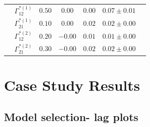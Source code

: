 \documentclass[12pt]{TD-CJS}
\begin{document}
\begin{table}[t]
{\begin{tabular}{ccccccc}
                             & $\Gamma^{*(1)}_{12}$          & $0.50$                         & $0.00$                   & $0.00$                           & $0.07 \pm 0.01$                             \\
                             & $\Gamma^{*(1)}_{21}$          & $0.10$                         & $0.00$                   & $0.02$                           & $0.02 \pm 0.00$                             \\
                             & $\Gamma^{*(2)}_{12}$          & $0.20$                         & $-0.00$                   & $0.01$                           & $0.01 \pm 0.00$                             \\
                             & $\Gamma^{*(2)}_{21}$          & $0.30$                         & $-0.00$                   & $0.02$                           & $0.02 \pm 0.00$                             \\ \hline

\end{tabular}
}
\label{table:Gamma}
\end{table}

\section{Case Study Results}

\subsection{Model selection- lag plots}
\end{document}
